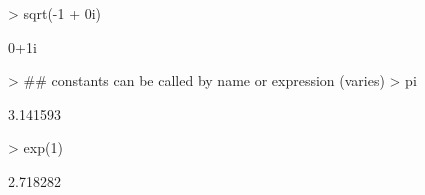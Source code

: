 \documentclass[10pt,letterpaper]{article}
\newenvironment{Schunk}{}{}
\begin{document}
\begin{Schunk}
\begin{Sinput}
> sqrt(-1 + 0i)
\end{Sinput}
\begin{Soutput}
[1] 0+1i
\end{Soutput}
\begin{Sinput}
> ## constants can be called by name or expression (varies)
> pi
\end{Sinput}
\begin{Soutput}
[1] 3.141593
\end{Soutput}
\begin{Sinput}
> exp(1)
\end{Sinput}
\begin{Soutput}
[1] 2.718282
\end{Soutput}
\end{Schunk}


\end{document}
